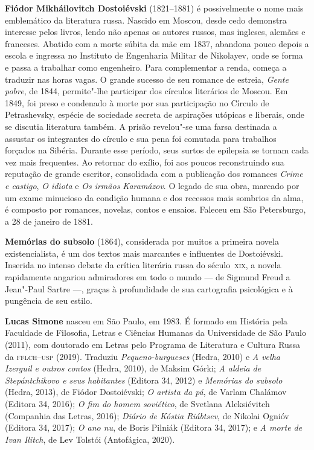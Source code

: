 \textbf{Fiódor Mikháilovitch Dostoiévski} (1821--1881) é possivelmente o nome mais emblemático da literatura russa. Nascido em Moscou, desde cedo demonstra interesse pelos livros, lendo não apenas os autores russos, mas ingleses, alemães e franceses. Abatido com a morte súbita da mãe em 1837, abandona pouco depois a escola e ingressa no Instituto de Engenharia Militar de Nikolayev, onde se forma e passa a trabalhar como engenheiro. Para complementar a renda, começa a traduzir nas horas vagas. O grande sucesso de seu romance de estreia, \textit{Gente pobre}, de 1844, permite"-lhe participar dos círculos literários de Moscou. Em 1849, foi preso e condenado à morte por sua participação no Círculo de Petrashevsky, espécie de sociedade secreta de aspirações utópicas e liberais, onde se discutia literatura também. A prisão revelou"-se uma farsa destinada a assustar os integrantes do círculo e sua pena foi comutada para trabalhos forçados na Sibéria. Durante esse período, seus surtos de epilepsia se tornam cada vez mais frequentes. Ao retornar do exílio, foi aos poucos reconstruindo sua reputação de grande escritor, consolidada com a publicação dos romances \textit{Crime e castigo}, \textit{O idiota} e \textit{Os irmãos Karamázov}. O legado de sua obra, marcado por um exame minucioso da condição humana e dos recessos mais sombrios da alma, é composto por romances, novelas, contos e ensaios. Faleceu em São Petersburgo, a 28 de janeiro de 1881.

\textbf{Memórias do subsolo} (1864), considerada por muitos a primeira
novela existencialista, é um dos textos mais marcantes e influentes de Dostoiévski. 
Inserida no intenso debate da crítica literária russa do século~\textsc{xix}, a novela 
rapidamente angariou admiradores em todo o mundo --- de Sigmund Freud a Jean"-Paul Sartre ---,
graças à profundidade de sua cartografia psicológica e à pungência de seu estilo.
        
\textbf{Lucas Simone} nasceu em São Paulo, em 1983. É formado em História pela Faculdade de Filosofia, Letras e Ciências Humanas da Universidade de São Paulo (2011), com doutorado em Letras pelo Programa de Literatura e Cultura Russa da \textsc{fflch--usp} (2019). Traduziu \textit{Pequeno-burgueses} (Hedra, 2010) e \textit{A velha Izerguil e outros contos} (Hedra, 2010), de Maksim Górki; \textit{A aldeia de Stepántchikovo e seus habitantes} (Editora 34, 2012) e \textit{Memórias do subsolo} (Hedra, 2013), de Fiódor Dostoiévski; \textit{O artista da pá}, de Varlam Chalámov (Editora 34, 2016); \textit{O fim do homem soviético}, de Svetlana Aleksiévitch (Companhia das Letras, 2016); \textit{Diário de Kóstia Riábtsev}, de Nikolai Ognióv (Editora 34, 2017); \textit{O ano nu}, de Boris Pilniák (Editora 34, 2017); e \textit{A morte de Ivan Ilitch}, de Lev Tolstói (Antofágica, 2020).

